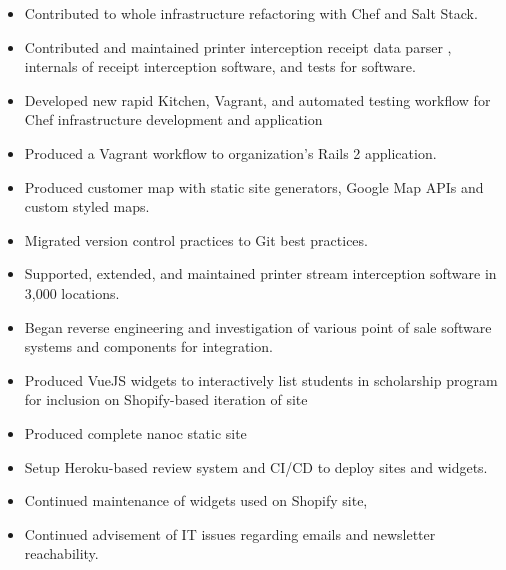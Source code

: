 \documentclass[10pt,letter,ragged2e]{altacv}
\begin{document}
\begin{paracol}{2}
\begin{itemize}
\item Contributed to whole infrastructure refactoring with Chef and Salt Stack.
\item Contributed and maintained printer interception receipt data parser , internals of receipt interception software, and tests for software.
\item Developed new rapid Kitchen, Vagrant, and automated testing workflow for Chef infrastructure development and application
\item Produced a Vagrant workflow to organization's Rails 2 application.
\item Produced customer map with static site generators, Google Map APIs and custom styled maps. 
\item Migrated version control practices to Git best practices.
\item Supported, extended, and maintained printer stream interception software in 3,000 locations.
\item Began reverse engineering and investigation of various point of sale software systems and components for integration.
\end{itemize}

\begin{itemize}
\item Produced VueJS widgets to interactively list students in scholarship program for inclusion on Shopify-based iteration of site
\item Produced complete nanoc static site
\item Setup Heroku-based review system and CI/CD to deploy sites and widgets.
\item Continued maintenance of widgets used on Shopify site,
\item Continued advisement of IT issues regarding emails and newsletter reachability.
\end{itemize}





\end{paracol}
\end{document}

